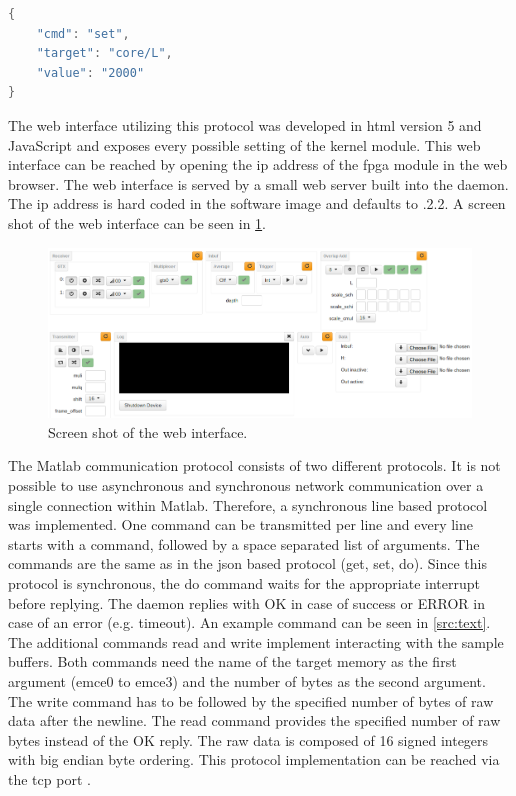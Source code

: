 \documentclass[12pt,a4paper,parskip=full,abstract=true,BCOR=12mm,twoside,open=right]{scrreprt}
\newcommand{\hack}{}
\begin{document}
\begin{lstlisting}[language=Java,float=htb,caption={Example \gls{json} formated packet to set $\gls{L}=2000$},label=src:json,basicstyle=\hack\scriptsize]
{
    "cmd": "set",
    "target": "core/L",
    "value": "2000"
}
\end{lstlisting}

The web interface utilizing this protocol was developed in \gls{html} version 5 and JavaScript and exposes
every possible setting of the kernel module. This web interface can be reached
by opening the \gls{ip} address of the \gls{fpga} module in the web browser. The
web interface is served by a small web server built into the daemon. The \gls{ip}
address is hard coded in the software image and defaults to {.2.2}.
A screen shot of the web interface can be seen in \cref{fig:webinterface}.

\begin{figure}[htb]
    \centering
    \includegraphics[width=\textwidth]{webinterface}
    \caption{Screen shot of the web interface.}
    \label{fig:webinterface}
\end{figure}

The Matlab communication protocol consists of two different protocols. It is not
possible to use asynchronous and synchronous network communication over a single
connection within Matlab. Therefore, a synchronous line based protocol was implemented.
One command can be transmitted per line and every line starts with a command, followed
by a space separated list of arguments. The commands are the same as in the \gls{json}
based protocol ({\ttfamily get}, {\ttfamily set}, {\ttfamily do}). Since this protocol is synchronous, the
{\ttfamily do} command waits for the appropriate interrupt before replying. The daemon replies with
{\ttfamily OK} in case of success or {\ttfamily ERROR} in case of an error (e.g. timeout). An example
command can be seen in \cref{src:text}. The additional commands {\ttfamily read} and {\ttfamily write}
implement interacting with the sample buffers. Both commands need the name of the target memory as
the first argument ({\ttfamily emce0} to {\ttfamily emce3}) and the number of bytes as the second
argument. The {\ttfamily write} command has to be followed by the specified number of bytes of raw data after the
newline. The {\ttfamily read} command provides the specified number of raw bytes instead of the {\ttfamily OK} reply.
The raw data is composed of \SI{16}{\bit} signed integers with big endian byte ordering. This protocol implementation
can be reached via the \gls{tcp} port {}.
\end{document}
